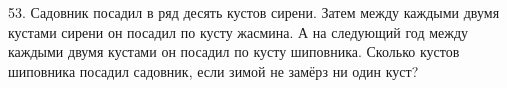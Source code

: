 53. Садовник посадил в ряд десять кустов сирени. Затем между каждыми двумя кустами сирени он посадил по кусту жасмина. А на следующий год между каждыми двумя кустами он посадил по кусту шиповника. Сколько кустов шиповника посадил садовник, если зимой не замёрз ни один куст?\\
